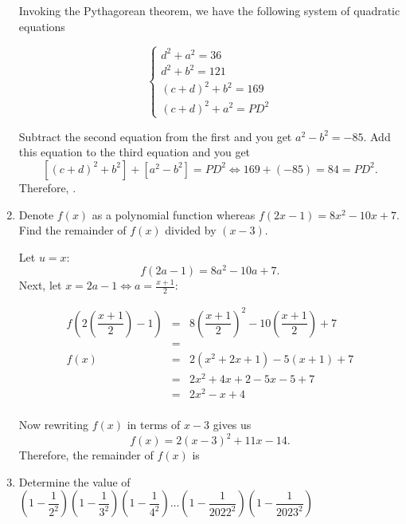 \documentclass[11pt,paper={letter}]{scrartcl}
\begin{document}
\begin{enumerate}[label=\textbf{\arabic*}.]
\begin{center}
\end{center}

Invoking the Pythagorean theorem, we have the following system of quadratic equations

\begin{equation*}
    \begin{cases}
    d^2 +a^2 = 36 \\ d^2 + b^2 = 121 \\ (c+d)^2 + b^2 = 169 \\ (c+d)^2 + a^2 = PD^2
    \end{cases}
\end{equation*}

Subtract the second equation from the first and you get $a^2 - b^2 = -85$. Add this equation to the third equation and you get $$[(c+d)^2 + b^2] + [a^2 - b^2] = PD^2 \Longleftrightarrow 169 + (-85) = 84 = PD^2.$$ Therefore, . 


\item Denote $f(x)$ as a polynomial function whereas $f(2x-1) = 8x^2 -10x +7$. Find the remainder of $f(x)$ divided by $(x-3).$


\sol Let $u = x$: $$f(2a -1) = 8a^2 - 10a + 7.$$ Next, let $x = 2a - 1 \Longleftrightarrow a = \frac{x+1}{2}$:

\begin{equation*}
    \begin{array}{rcl}
         f\left(2\left(\dfrac{x+1}{2}\right) - 1\right)&  = & 8\left(\dfrac{x+1}{2}\right)^2 - 10\left(\dfrac{x+1}{2}\right) + 7\\

         &=& \\

           f(x)&  = & 2\left(x^2 + 2x +1\right) - 5(x+1) + 7\\

           &  = & 2x^2 + 4x + 2 -5x - 5 + 7\\

           & = & 2x^2 - x + 4 \\
    \end{array}
\end{equation*}

Now rewriting $f(x)$ in terms of $x-3$ gives us $$f(x) =
2(x-3)^2 + 11x - 14.$$ Therefore, the remainder of $f(x)$ is 

\item Determine the value of $\left(1 - \dfrac{1}{2^2}\right)\left(1 - \dfrac{1}{3^2}\right)\left(1 - \dfrac{1}{4^2}\right)\ldots\left(1 - \dfrac{1}{2022^2}\right)\left(1 - \dfrac{1}{2023^2}\right)$


\end{enumerate}
\end{document}
